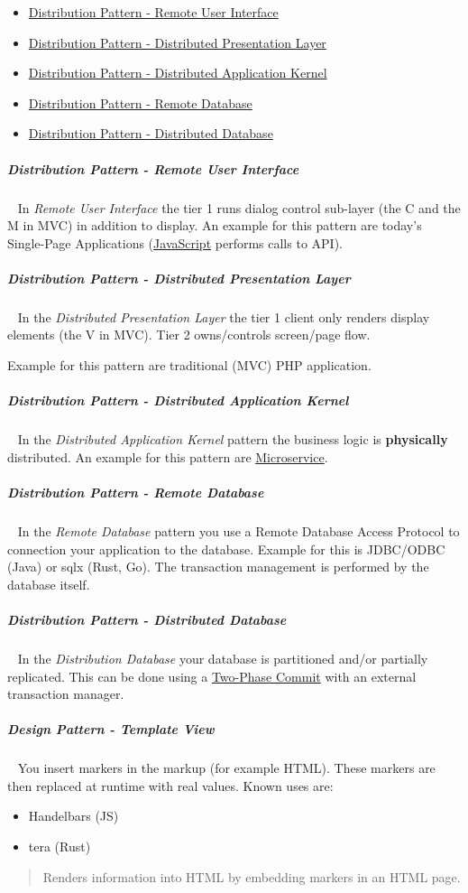 \documentclass[11pt,twoside,landscape]{article}
\begin{document}
\begin{multicols}{3}
\begin{itemize}
\item \href{../../../roam/20230107150231-distribution_pattern_remote_user_interface.org}{Distribution Pattern - Remote User Interface}
\item \href{../../../roam/20230107150503-distribution_pattern_distributed_presentation_layer.org}{Distribution Pattern - Distributed Presentation Layer}
\item \href{../../../roam/20230107150808-distribution_pattern_distributed_application_kernel.org}{Distribution Pattern - Distributed Application Kernel}
\item \href{../../../roam/20230107151100-distribution_pattern_remote_database.org}{Distribution Pattern - Remote Database}
\item \href{../../../roam/20230107151436-distribution_pattern_distributed_database.org}{Distribution Pattern - Distributed Database}
\end{itemize}
\subparagraph{Distribution Pattern - Remote User Interface} \
\label{sec:orgce7cfef}
In \emph{Remote User Interface} the tier 1 runs dialog control sub-layer (the C and the M in MVC) in addition to display.
An example for this pattern are today's Single-Page Applications (\href{../../../roam/20220513105545-javascript.org}{JavaScript} performs calls to API).
\subparagraph{Distribution Pattern - Distributed Presentation Layer} \
\label{sec:org232bc81}
In the \emph{Distributed Presentation Layer} the tier 1 client only renders display elements (the V in MVC).
Tier 2 owns/controls screen/page flow.

Example for this pattern are traditional (MVC) PHP application.
\subparagraph{Distribution Pattern - Distributed Application Kernel} \
\label{sec:org696a443}
In the \emph{Distributed Application Kernel} pattern the business logic is \textbf{physically} distributed.
An example for this pattern are \href{../../../roam/20230107150950-what_are_microservices.org}{Microservice}.
\subparagraph{Distribution Pattern - Remote Database} \
\label{sec:org49621ab}
In the \emph{Remote Database} pattern you use a Remote Database Access Protocol to connection your application to the database.
Example for this is JDBC/ODBC (Java) or sqlx (Rust, Go).
The transaction management is performed by the database itself.
\subparagraph{Distribution Pattern - Distributed Database} \
\label{sec:orgc7edd52}
In the \emph{Distribution Database} your database is partitioned and/or partially replicated.
This can be done using a \href{../../../roam/20230107151606-what_is_a_two_phase_commit.org}{Two-Phase Commit} with an external transaction manager.
\subparagraph{Design Pattern - Template View} \
\label{sec:orge02495f}
You insert markers in the markup (for example HTML).
These markers are then replaced at runtime with real values.
Known uses are:
\begin{itemize}
\item Handelbars (JS)
\item tera (Rust)
\end{itemize}

\begin{quote}
Renders information into HTML by embedding markers in an HTML page.
\end{quote}
\end{multicols}
\end{document}
